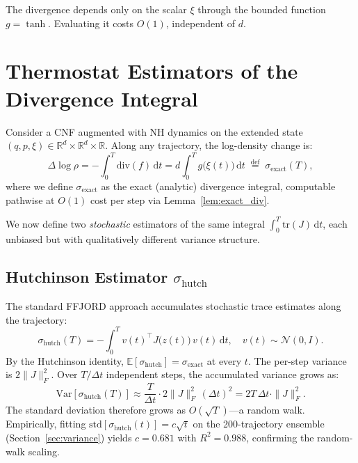 \documentclass[11pt]{article}
\newcommand{\R}{\mathbb{R}}
\newcommand{\E}{\mathbb{E}}
\newcommand{\Var}{\mathrm{Var}}
\newcommand{\tr}{\mathrm{tr}}
\newcommand{\divergence}{\mathrm{div}}
\newcommand{\dd}{\mathrm{d}}
\newcommand{\shutch}{\sigma_{\mathrm{hutch}}}
\newcommand{\sexact}{\sigma_{\mathrm{exact}}}
\begin{document}
The divergence depends only on the scalar $\xi$ through the bounded function
$g = \tanh$. Evaluating it costs $O(1)$, independent of $d$.

\section{Thermostat Estimators of the Divergence Integral}
\label{sec:estimators}

Consider a CNF augmented with NH dynamics on the extended state
$(q, p, \xi) \in \R^d \times \R^d \times \R$. Along any trajectory, the
log-density change is:
\begin{equation}
  \Delta \log \rho = -\int_0^T \divergence(f)\,\dd t
    = d \int_0^T g\bigl(\xi(t)\bigr)\,\dd t
    \;\stackrel{\text{def}}{=}\; \sexact(T),
  \label{eq:sigma_exact}
\end{equation}
where we define $\sexact$ as the exact (analytic) divergence integral,
computable pathwise at $O(1)$ cost per step via Lemma~\ref{lem:exact_div}.

We now define two \emph{stochastic} estimators of the same integral
$\int_0^T \tr(J)\,\dd t$, each unbiased but with qualitatively different
variance structure.

\subsection{Hutchinson Estimator $\shutch$}
\label{sec:hutch_estimator}

The standard FFJORD approach accumulates stochastic trace estimates along the
trajectory:
\begin{equation}
  \shutch(T) = -\int_0^T v(t)^\top J\bigl(z(t)\bigr)\,v(t)\,\dd t,
  \quad v(t) \sim \mathcal{N}(0, I).
  \label{eq:sigma_hutch}
\end{equation}
By the Hutchinson identity, $\E[\shutch] = \sexact$ at every $t$. The
per-step variance is $2\|J\|_F^2$. Over $T/\Delta t$ independent steps, the
accumulated variance grows as:
\begin{equation}
  \Var[\shutch(T)] \approx \frac{T}{\Delta t} \cdot 2\|J\|_F^2\,(\Delta t)^2
  = 2T\,\Delta t \cdot \|J\|_F^2.
  \label{eq:var_hutch}
\end{equation}
The standard deviation therefore grows as $O(\sqrt{T})$---a random walk.
Empirically, fitting $\text{std}[\shutch(t)] = c\sqrt{t}$ on the 200-trajectory
ensemble (Section~\ref{sec:variance}) yields $c = 0.681$ with $R^2 = 0.988$,
confirming the random-walk scaling.
\end{document}
